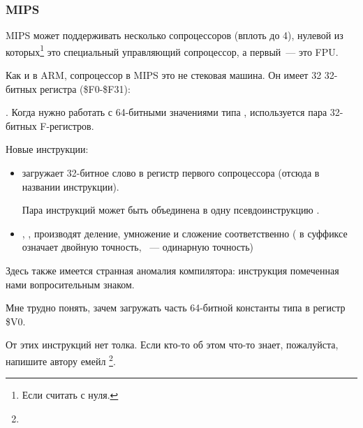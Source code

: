 \subsubsection{MIPS}

MIPS может поддерживать несколько сопроцессоров (вплоть до 4), нулевой из которых\footnote{Если считать с нуля.} это специальный
управляющий сопроцессор, а первый~--- это FPU.

Как и в ARM, сопроцессор в MIPS это не стековая машина. Он имеет 32 32-битных регистра (\$F0-\$F31):

.
Когда нужно работать с 64-битными значениями типа \Tdouble, используется пара 32-битных F-регистров.



Новые инструкции:

\begin{itemize}

\item {} загружает 32-битное слово в регистр первого сопроцессора (отсюда  в названии инструкции).

Пара инструкций  может быть объединена в одну псевдоинструкцию .

\item {}, ,  производят деление, умножение и сложение соответственно 
( в суффиксе означает двойную точность, ~--- одинарную точность)

\end{itemize}

\myindex{\CompilerAnomaly}
\label{MIPS_FPU_LUI}
Здесь также имеется странная аномалия компилятора: инструкция  помеченная нами вопросительным знаком.%

Мне трудно понять, зачем загружать часть 64-битной константы типа \Tdouble в регистр \$V0.

От этих инструкций нет толка.
Если кто-то об этом что-то знает, пожалуйста, напишите автору емейл \footnote{\EMAILS}.

